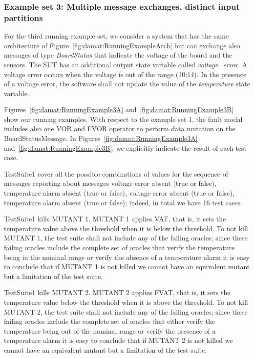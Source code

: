 \clearpage 
\subsubsection{Example set 3: Multiple message exchanges, distinct input partitions}
\label{sec:dataDriven:example:3}

For the third running example set, we consider a system that has the same architecture of  Figure~\ref{fig:damat:RunningExampleArch} but can exchange also messages of type \emph{BoardStatus} that indicate the voltage of the board and the sensors. The SUT has an additional output state variable called \emph{voltage\_error}. A voltage error occurs when the voltage is out of the range (10;14). In the presence of a voltage error, the software shall not update the value of the \emph{temperature} state variable.

Figures~\ref{fig:damat:RunningExample3A} and~\ref{fig:damat:RunningExample3B} show our running examples. With respect to the example set 1, the fault modal includes also one VOR and FVOR operator to perform data mutation on the BoardStatusMessage. In Figures~\ref{fig:damat:RunningExample3A} and~\ref{fig:damat:RunningExample3B}, we explicitly indicate the result of each test case.

TestSuite1 cover all the possible combinations of values for the sequence of messages reporting about messages voltage error absent (true or false), temperature alarm absent (true or false), voltage error absent (true or false), temperature alarm absent (true or false); indeed, in total we have 16 test cases.

TestSuite1 kills MUTANT 1. MUTANT 1 applies VAT, that is, it sets the temperature value above the threshold when it is below the threshold. To not kill MUTANT 1, the test suite shall not include any of the failing oracles; since these failing oracles include the complete set of oracles that verify the temperature being in the nominal range or verify the absence of a temperature alarm it is easy to conclude that if MUTANT 1 is not killed we cannot have an equivalent mutant but a limitation of the test suite.

TestSuite1 kills MUTANT 2. MUTANT 2 applies FVAT, that is, it sets the temperature value below the threshold when it is above the threshold. To not kill MUTANT 2, the test suite shall not include any of the failing oracles; since these failing oracles include the complete set of oracles that either verify the temperature being out of the nominal range or verify the presence of a temperature alarm it is easy to conclude that if MUTANT 2 is not killed we cannot have an equivalent mutant but a limitation of the test suite.

